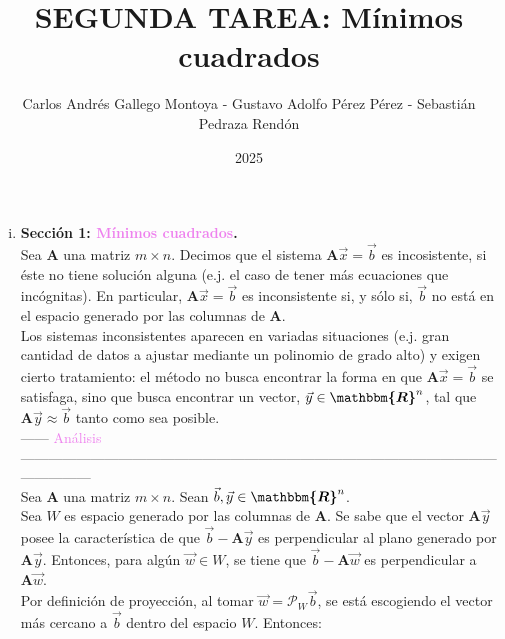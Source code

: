 \documentclass[11pt]{article}
\theoremstyle{definition}
\def\R{\boldsymbol{\mathbbm{R}}}
\begin{document}
\title{\textbf{SEGUNDA TAREA:} M\'inimos cuadrados}

\author{Carlos Andr\'es Gallego Montoya - Gustavo Adolfo P\'erez P\'erez - Sebasti\'an Pedraza Rend\'on}
\date{2025}
%
\maketitle
%

%
\begin{enumerate}[(i)]
%
%

	\item\textbf{Secci\'on 1: \textcolor{violet}{M\'inimos cuadrados}.}\\
Sea $\textbf{A}$ una matriz $m \times n$. Decimos que el sistema $\textbf{A}\vec{x} = \vec{b}$ es incosistente, si \'este no tiene soluci\'on alguna (e.j. el caso de tener m\'as ecuaciones que inc\'ognitas). En particular, $\textbf{A}\vec{x} = \vec{b}$ es inconsistente si, y s\'olo si, $\vec{b}$ no est\'a en el espacio generado por las columnas de $\textbf{A}$.\\
Los sistemas inconsistentes aparecen en variadas situaciones (e.j. gran cantidad de datos a ajustar mediante un polinomio de grado alto) y exigen cierto tratamiento: el m\'etodo no busca encontrar la forma en que $\textbf{A}\vec{x} = \vec{b}$ se satisfaga, sino que busca encontrar un vector, $\vec{y} \in \R^{n}$, tal que $\textbf{A}\vec{y} \approx \vec{b}$ tanto como sea posible.\\
\vspace{2mm} %
------ \textcolor{violet}{An\'alisis} ---------------------------------------------------------------------------------------------------------------------\\
\vspace{2mm} %
Sea $\textbf{A}$ una matriz $m \times n$. Sean $\vec{b}, \vec{y} \in \R^{n}$.\\
Sea $W$ es espacio generado por las columnas de $\textbf{A}$. Se sabe que el vector $\textbf{A}\vec{y}$ posee la caracter\'istica de que $\vec{b} - \textbf{A}\vec{y}$ es perpendicular al plano generado por $\textbf{A}\vec{y}$. Entonces, para alg\'un $\vec{w} \in W$, se tiene que $\vec{b} - \textbf{A}\vec{w}$ es perpendicular a $\textbf{A}\vec{w}$.\\
Por definici\'on de proyecci\'on, al tomar $\vec{w} = \mathcal{P}_{W}\vec{b}$, se est\'a escogiendo el vector m\'as cercano a $\vec{b}$ dentro del espacio $W$. Entonces:
\begin{equation*}

\end{equation*}
\end{enumerate}
\end{document}
